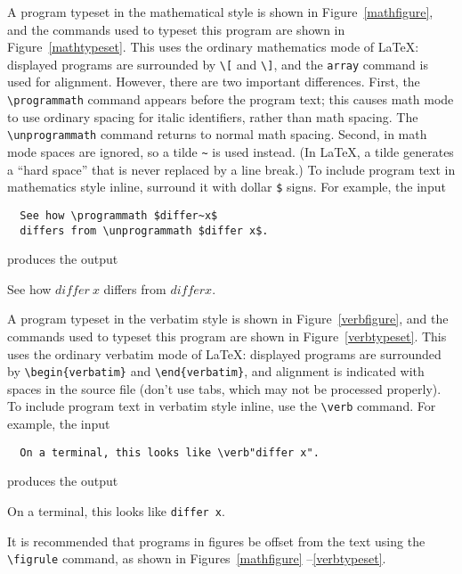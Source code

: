 \documentclass{jfp1}
\begin{document}
A program typeset in the mathematical style is shown in
Figure~\ref{mathfigure}, and the commands used to typeset this program
are shown in Figure~\ref{mathtypeset}.  This uses the ordinary
mathematics mode of \LaTeX: displayed programs are surrounded by
\verb|\[| and \verb|\]|, and the \verb|array| command is used for
alignment.  However, there are two important differences.  First, the
\verb|\programmath| command appears before the program text; this
causes math mode to use ordinary spacing for italic identifiers,
rather than math spacing.  The \verb|\unprogrammath| command returns
to normal math spacing.  Second, in math mode spaces are ignored, so a
tilde \verb|~| is used instead.  (In \LaTeX, a tilde generates a
``hard space'' that is never replaced by a line break.)  To include
program text in mathematics style inline, surround it with dollar
\verb|$| signs.  For example, the input
\begin{verbatim}
  See how \programmath $differ~x$
  differs from \unprogrammath $differ x$.
\end{verbatim}
produces the output
\begin{center}
  See how \programmath $differ~x$
  differs from \unprogrammath $differ x$.
\end{center}

A program typeset in the verbatim style is shown in
Figure~\ref{verbfigure}, and the commands used to typeset this program
are shown in Figure~\ref{verbtypeset}.  This uses the ordinary
verbatim mode of \LaTeX: displayed programs are surrounded by
\verb|\begin{verbatim}| and \verb|\end{verbatim}|, and alignment is
indicated with spaces in the source file (don't use tabs, which may
not be processed properly).  To include program
text in verbatim style inline, use the \verb|\verb| command.
For example, the input
\begin{center}
\begin{verbatim}
  On a terminal, this looks like \verb"differ x".
\end{verbatim}
\end{center}
produces the output
\begin{center}
  On a terminal, this looks like \verb"differ x".
\end{center}

It is recommended that programs in figures be offset from the text
using the \verb|\figrule| command, as shown in Figures~\ref{mathfigure}%
--\ref{verbtypeset}.
\end{document}
